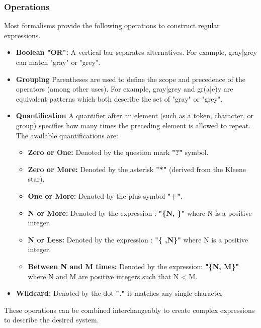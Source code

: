 \subsubsection{Operations}
Most formalisms provide the following operations to construct regular expressions. 
\begin{itemize}
    \item \textbf{Boolean "OR":} A vertical bar separates alternatives. For example, gray|grey can match "gray" or "grey".
    \item \textbf{Grouping} Parentheses are used to define the scope and precedence of the operators (among other uses). For example, gray|grey and gr(a|e)y are equivalent patterns which both describe the set of "gray" or "grey".
    \item \textbf{Quantification} A quantifier after an element (such as a token, character, or group) specifies how many times the preceding element is allowed to repeat.
    The available quantifications are:
    \begin{itemize}
        \item \textbf{Zero or One:} Denoted by the question mark \textbf{"?"} symbol.
        \item \textbf{Zero or More:} Denoted by the asterisk \textbf{"*"} (derived from the Kleene star). 
        \item \textbf{One or More:} Denoted by the plus symbol \textbf{"+"}.
        \item \textbf{N or More:} Denoted by the expression : \textbf{"\{N, \}"} where N is a positive integer.
        \item \textbf{N or Less:} Denoted by the expression : \textbf{"\{ ,N\}"} where N is a positive integer.
        \item \textbf{Between N and M times:} Denoted by the expression: \textbf{"\{N, M\}"} where N and M are positive integers such that N < M.
    \end{itemize}
    \item \textbf{Wildcard:} Denoted by the dot \textbf{"."} it matches any single character
\end{itemize}
These operations can be combined interchangeably to create complex expressions to describe the desired system.

